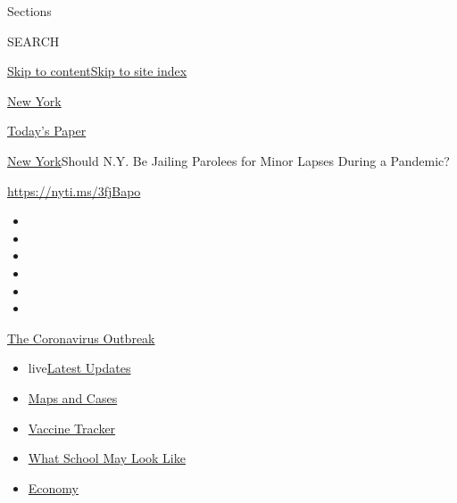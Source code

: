 Sections

SEARCH

\protect\hyperlink{site-content}{Skip to
content}\protect\hyperlink{site-index}{Skip to site index}

\href{https://www.nytimes3xbfgragh.onion/section/nyregion}{New York}

\href{https://myaccount.nytimes3xbfgragh.onion/auth/login?response_type=cookie\&client_id=vi}{}

\href{https://www.nytimes3xbfgragh.onion/section/todayspaper}{Today's
Paper}

\href{/section/nyregion}{New York}\textbar{}Should N.Y. Be Jailing
Parolees for Minor Lapses During a Pandemic?

\url{https://nyti.ms/3fjBapo}

\begin{itemize}
\item
\item
\item
\item
\item
\item
\end{itemize}

\href{https://www.nytimes3xbfgragh.onion/news-event/coronavirus?action=click\&pgtype=Article\&state=default\&region=TOP_BANNER\&context=storylines_menu}{The
Coronavirus Outbreak}

\begin{itemize}
\tightlist
\item
  live\href{https://www.nytimes3xbfgragh.onion/2020/08/02/world/coronavirus-updates.html?action=click\&pgtype=Article\&state=default\&region=TOP_BANNER\&context=storylines_menu}{Latest
  Updates}
\item
  \href{https://www.nytimes3xbfgragh.onion/interactive/2020/us/coronavirus-us-cases.html?action=click\&pgtype=Article\&state=default\&region=TOP_BANNER\&context=storylines_menu}{Maps
  and Cases}
\item
  \href{https://www.nytimes3xbfgragh.onion/interactive/2020/science/coronavirus-vaccine-tracker.html?action=click\&pgtype=Article\&state=default\&region=TOP_BANNER\&context=storylines_menu}{Vaccine
  Tracker}
\item
  \href{https://www.nytimes3xbfgragh.onion/interactive/2020/07/29/us/schools-reopening-coronavirus.html?action=click\&pgtype=Article\&state=default\&region=TOP_BANNER\&context=storylines_menu}{What
  School May Look Like}
\item
  \href{https://www.nytimes3xbfgragh.onion/live/2020/07/31/business/stock-market-today-coronavirus?action=click\&pgtype=Article\&state=default\&region=TOP_BANNER\&context=storylines_menu}{Economy}
\end{itemize}

